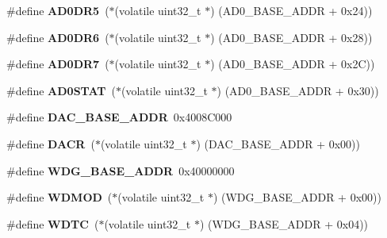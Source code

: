 \begin{DoxyCompactItemize}
\#define {\bfseries A\+D0\+D\+R5}~($\ast$(volatile uint32\+\_\+t $\ast$) (A\+D0\+\_\+\+B\+A\+S\+E\+\_\+\+A\+D\+DR + 0x24))
\item 
\mbox{\label{group__lpc24xx__regs_ga3509c30f0942504fe4c79c2bc8a4d3de}} 
\#define {\bfseries A\+D0\+D\+R6}~($\ast$(volatile uint32\+\_\+t $\ast$) (A\+D0\+\_\+\+B\+A\+S\+E\+\_\+\+A\+D\+DR + 0x28))
\item 
\mbox{\label{group__lpc24xx__regs_gafc45e343d5d496100a943d79d3a42249}} 
\#define {\bfseries A\+D0\+D\+R7}~($\ast$(volatile uint32\+\_\+t $\ast$) (A\+D0\+\_\+\+B\+A\+S\+E\+\_\+\+A\+D\+DR + 0x2\+C))
\item 
\mbox{\label{group__lpc24xx__regs_ga131707c7ef9f31c045d7bb9be431ae10}} 
\#define {\bfseries A\+D0\+S\+T\+AT}~($\ast$(volatile uint32\+\_\+t $\ast$) (A\+D0\+\_\+\+B\+A\+S\+E\+\_\+\+A\+D\+DR + 0x30))
\item 
\mbox{\label{group__lpc24xx__regs_gac105318d5f9ffb075caed0a56711f3a4}} 
\#define {\bfseries D\+A\+C\+\_\+\+B\+A\+S\+E\+\_\+\+A\+D\+DR}~0x4008\+C000
\item 
\mbox{\label{group__lpc24xx__regs_gaf8a4c578c83b8420c7ec010f84f3f0eb}} 
\#define {\bfseries D\+A\+CR}~($\ast$(volatile uint32\+\_\+t $\ast$) (D\+A\+C\+\_\+\+B\+A\+S\+E\+\_\+\+A\+D\+DR + 0x00))
\item 
\mbox{\label{group__lpc24xx__regs_gae8844752ed71e6be59c8527185465038}} 
\#define {\bfseries W\+D\+G\+\_\+\+B\+A\+S\+E\+\_\+\+A\+D\+DR}~0x40000000
\item 
\mbox{\label{group__lpc24xx__regs_ga37c4add55fd2c30091f3e4d796feeca8}} 
\#define {\bfseries W\+D\+M\+OD}~($\ast$(volatile uint32\+\_\+t $\ast$) (W\+D\+G\+\_\+\+B\+A\+S\+E\+\_\+\+A\+D\+DR + 0x00))
\item 
\mbox{\label{group__lpc24xx__regs_ga3e307aaee495eda03358a2ee3bf88c94}} 
\#define {\bfseries W\+D\+TC}~($\ast$(volatile uint32\+\_\+t $\ast$) (W\+D\+G\+\_\+\+B\+A\+S\+E\+\_\+\+A\+D\+DR + 0x04))
\item 
\mbox{\label{group__lpc24xx__regs_ga02d688463660c741e72dc905582805e9}} 

\end{DoxyCompactItemize}

